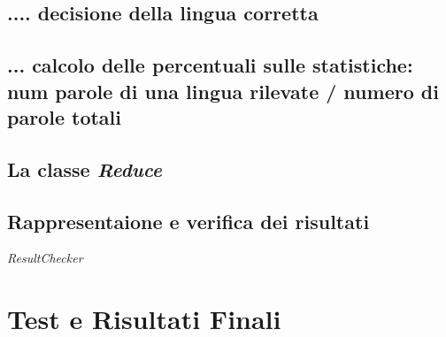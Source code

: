 \documentclass{article}
\newcommand{\filename}[1]{\textit{#1}}
\begin{document}
\subsection{ .... decisione della lingua corretta}

\subsection{ ... calcolo delle percentuali sulle statistiche: num parole di una lingua rilevate / numero di parole totali}

\subsection{La classe \textit{Reduce}}
\subsection{Rappresentaione e verifica dei risultati}
\filename{ResultChecker}

\section{Test e Risultati Finali}
\end{document}
